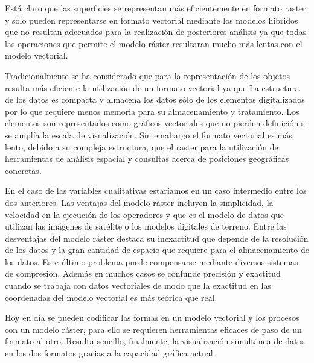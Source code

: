 Está claro que las superficies se representan más eficientemente en formato raster y sólo pueden representarse
en formato vectorial mediante los modelos híbridos que no resultan adecuados para la realización de posteriores
análisis ya que todas las operaciones que permite el modelo ráster resultaran mucho más lentas con el modelo
vectorial.

Tradicionalmente se ha considerado que para la representación de los objetos resulta más eficiente la utilización
de un formato vectorial ya que La estructura de los datos es compacta y almacena los datos sólo de los elementos
digitalizados por lo que requiere menos memoria para su almacenamiento y tratamiento. Los elementos son representados
como gráficos vectoriales que no pierden definición si se amplía la escala de visualización. Sin emabargo el formato
vectorial es más lento, debido a su compleja estructura, que el raster para la utilización de herramientas de análisis
espacial y consultas acerca de posiciones geográficas concretas.

En el caso de las variables cualitativas estaríamos en un caso intermedio entre los dos anteriores.
Las ventajas del modelo ráster incluyen la simplicidad, la velocidad en la ejecución de los operadores y que es
el modelo de datos que utilizan las imágenes de satélite o los modelos digitales de terreno. Entre las desventajas
del modelo ráster destaca su inexactitud que depende de la resolución de los datos y la gran cantidad de espacio
que requiere para el almacenamiento de los datos. Este último problema puede compensarse mediante diversos
sistemas de compresión. Además en muchos casos se confunde precisión y exactitud cuando se trabaja con
datos vectoriales de modo que la exactitud en las coordenadas del modelo vectorial es más teórica que real.

Hoy en día se pueden codificar las formas en un modelo vectorial y los procesos con un modelo ráster,
para ello se requieren herramientas eficaces de paso de un formato al otro. Resulta sencillo, finalmente, la
visualización simultánea de datos en los dos formatos gracias a la capacidad gráfica actual.
